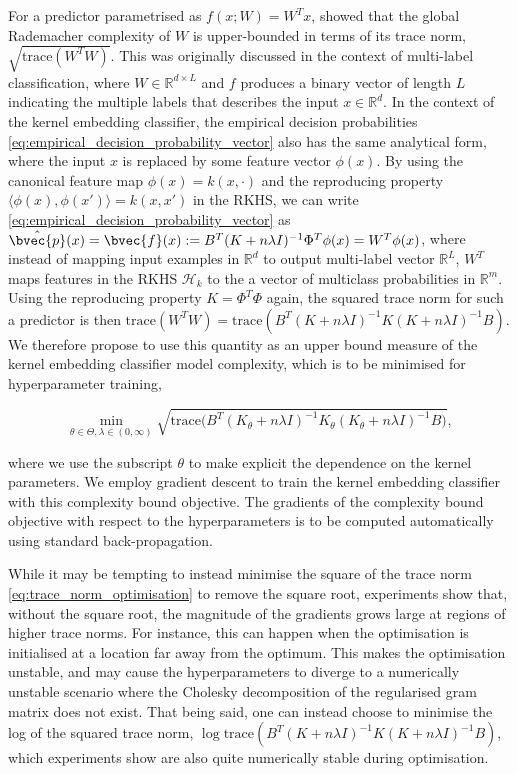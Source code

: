 \documentclass{article}
\begin{document}
	For a predictor parametrised as $f(x; W) = W^{T} x$, \cite{yu2014large} showed that the global Rademacher complexity of $W$ is upper-bounded in terms of its trace norm, $\sqrt{\mathrm{trace}(W^{T} W)}$. This was originally discussed in the context of multi-label classification, where $W \in \mathbb{R}^{d \times L}$ and $f$ produces a binary vector of length $L$ indicating the multiple labels that describes the input $x \in \mathbb{R}^{d}$. In the context of the kernel embedding classifier, the empirical decision probabilities \eqref{eq:empirical_decision_probability_vector} also has the same analytical form, where the input $x$ is replaced by some feature vector $\phi(x)$. By using the canonical feature map $\phi(x) = k(x, \cdot)$ and the reproducing property $\langle \phi(x), \phi(x') \rangle = k(x, x')$ in the RKHS, we can write \eqref{eq:empirical_decision_probability_vector} as $\hat{\bvec{p}}(x) = \bvec{f}(x) := B^{T} (K + n \lambda I)^{-1} \Phi^{T} \phi(x) = W^{T} \phi(x)$, where instead of mapping input examples in $\mathbb{R}^{d}$ to output multi-label vector $\mathbb{R}^{L}$, $W^{T}$ maps features in the RKHS $\mathcal{H}_{k}$ to the a vector of multiclass probabilities in $\mathbb{R}^{m}$. Using the reproducing property $K = \Phi^{T} \Phi$ again, the squared trace norm for such a predictor is then $\mathrm{trace}(W^{T} W) = \mathrm{trace}(B^{T} (K + n \lambda I)^{-1} K (K + n \lambda I)^{-1} B)$. We therefore propose to use this quantity as an upper bound measure of the kernel embedding classifier model complexity, which is to be minimised for hyperparameter training,
	
	\begin{equation}
		\min_{\theta \in \Theta, \lambda \in (0, \infty)} \sqrt{\mathrm{trace}\bigg(B^{T} (K_{\theta} + n \lambda I)^{-1} K_{\theta} (K_{\theta} + n \lambda I)^{-1} B\bigg)},
	\label{eq:trace_norm_optimisation}
	\end{equation}
	
	where we use the subscript $\theta$ to make explicit the dependence on the kernel parameters. We employ gradient descent to train the kernel embedding classifier with this complexity bound objective. The gradients of the complexity bound objective with respect to the hyperparameters is to be computed automatically using standard back-propagation.
	
	While it may be tempting to instead minimise the square of the trace norm \eqref{eq:trace_norm_optimisation} to remove the square root, experiments show that, without the square root, the magnitude of the gradients grows large at regions of higher trace norms. For instance, this can happen when the optimisation is initialised at a location far away from the optimum. This makes the optimisation unstable, and may cause the hyperparameters to diverge to a numerically unstable scenario where the Cholesky decomposition of the regularised gram matrix does not exist. That being said, one can instead choose to minimise the log of the squared trace norm, $\log{\mathrm{trace}(B^{T} (K + n \lambda I)^{-1} K (K + n \lambda I)^{-1} B)}$, which experiments show are also quite numerically stable during optimisation.
	
\end{document}
